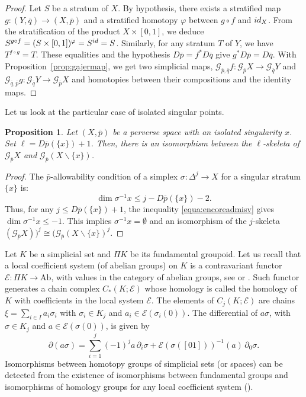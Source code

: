 \documentclass[a4paper,10pt,english,reqno]{amsart}
\theoremstyle{plain}
\newtheorem{proposition}{Proposition}[section]
\theoremstyle{definition}
\theoremstyle{remark}
\numberwithin{equation}{section}
\newcommand{\propref}[1]{Proposition~\ref{#1}}
\def\ov{\overline}
\def\cE{{\mathcal E}}
\def\crG{{\mathscr G}}
\def\id{{\rm id}}
\def\menos{\backslash}
\def\Ab{{\mathrm{Ab}}}
\renewcommand\1{\hbox{\ding{192}}}
\renewcommand\2{\hbox{\ding{193}}}
\newcommand\3{\hbox{\ding{194}}}
\newcommand\4{\hbox{\ding{195}}}
\begin{document}
\begin{proof}
Let $S$ be a stratum of $X$. By hypothesis,   there exists a stratified map $g\colon (Y,\ov{q})\to (X,\ov{p})$ and a stratified homotopy $\varphi$ between 
$g\circ f$ and $\id_{X}$.
%
From  the stratification of the product $X\times [0,1]$, we deduce
$S^{g\circ f}=(S\times [0,1])^{\varphi}=S^{\id}=S$.
%
Similarly, for any stratum $T$ of $Y$, we have $T^{f\circ g}=T$.
These equalities and the hypothesis $D\ov{p}=f^*D\ov{q}$ give $g^*D\ov{p}=D\ov{q}$. 
With \propref{prop:gajermap}, we get two simplicial maps,
$\crG_{\ov{p},\ov{q}}f\colon \crG_{\ov{p}}X\to \crG_{\ov{q}}Y$
and
$\crG_{\ov{q},\ov{p}}g\colon \crG_{\ov{q}}Y\to \crG_{\ov{p}}X$
and homotopies between their compositions and the identity maps.
\end{proof}

%
Let us  look at the particular case of isolated singular points.

\begin{proposition}\label{prop:isolatedgajer}
Let $(X,\ov{p})$ be a perverse space with an isolated singularity $x$.
Set $\ell=D\ov{p}(\{x\})+1$.
%
Then, there is an isomorphism between the $\ell$-skeleta of $\crG_{\ov{p}}X$ 
and $\crG_{\ov{p}}(X\menos \{x\})$. 
%
\end{proposition}

\begin{proof}
The $\ov{p}$-allowability condition of a simplex $\sigma\colon \Delta^j \to  X$ for a singular stratum $\{x\}$  is:
\begin{equation}\label{equa:encoreadmisv}
\dim \sigma^{-1}x \leq j - D\ov{p}(\{x\})-2 .
\end{equation}
Thus, for any $j\leq D\ov{p}(\{x\})+1$, the inequality \eqref{equa:encoreadmisv}  gives
$\dim \sigma^{-1}x \leq -1$.
This implies $\sigma^{-1}x=\emptyset$ and an isomorphism of the $j$-skeleta
$(\crG_{\ov{p}}X))^{j}\cong (\crG_{\ov{p}}(X\menos\{x\})^{j}$.
%
\end{proof}

Let $K$ be a simplicial set and $\Pi K$ be its fundamental groupoid. Let us recall that a
local coefficient system (of abelian groups) on $K$ is a contravariant functor
$\cE\colon \Pi K\to \Ab$,
with values in the category of abelian groups, see \cite[Appendix I]{MR0210125} or \cite[Page 340]{MR1711612}.
Such functor generates a chain complex $C_{*}(K;\cE)$ whose homology is called the homology of $K$
with coefficients in the local system $\cE$. The elements of $C_{j}(K;\cE)$ are chains
$\xi=\sum_{i\in I}a_{i}\sigma_{i}$ with 
$\sigma_{i}\in K_{j}$ 
and $a_{i}\in \cE(\sigma_{i}(0))$. 
The differential of  $a\sigma$, with $\sigma\in K_{j}$ and $a\in \cE(\sigma(0))$, 
is given by
$$\partial (a\sigma)=\sum_{i=1}^j (-1)^j a\,\partial_{i}\sigma+\cE(\sigma([01]))^{-1}(a)\,\partial_{0}\sigma.
$$
Isomorphisms between homotopy groups of simplicial sets (or spaces) can be detected from the existence of 
isomorphisms between fundamental groups and isomorphisms of homology groups
for any local coefficient system 
 (\cite[Proposition II.3.4]{MR0223432}). 
\end{document}
